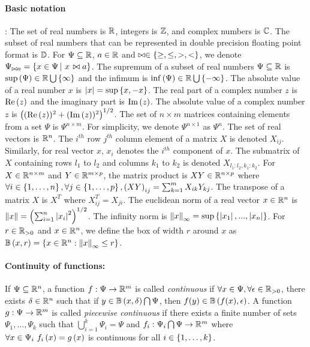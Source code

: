 \paragraph{Basic notation}:  The set of real numbers is $\mathbb{R}$,
integers is $\mathbb{Z}$, and complex numbers is $\mathbb{C}$.  The subset
of real numbers that can be represented in double precision floating
point format is $\mathbb{D}$.  For $\Psi\subseteq\mathbb{R}$, $a\in\mathbb{R}$
and $\bowtie\in\left\{\geq,\leq,>,<\right\}$, we denote $\Psi_{\bowtie a}
= \left\{ x\in\Psi \left|~x\right. \bowtie a \right\}$.  The supremum of a subset of real
numbers $\Psi\subseteq\mathbb{R}$ is
$\sup\left(\Psi\right)\in\mathbb{R}\bigcup\left\{\infty\right\}$ and the infimum is
$\inf\left(\Psi\right)\in\mathbb{R}\bigcup\left\{-\infty\right\}$.  The absolute value of a
real number $x$ is $\left|x\right| = \sup\left\{x,-x\right\}$.  The real part of a
complex number $z$ is $\operatorname{Re}\left(z\right)$ and the imaginary part is $\operatorname{Im}\left(z\right)$.  The
absolute value of a complex number $z$ is $\left((\operatorname{Re}\left(z\right))^2
+ (\operatorname{Im}\left(z\right))^2\right)^{1/2}$.  
The set of $n\times m$ matrices containing elements from a set $\Psi$
is $\Psi^{n\times m}$.  For simplicity, we denote $\Psi^{n\times 1}$
as $\Psi^n$.  The set of real vectors is $\mathbb{R}^n$.  The $i^{th}$ row
$j^{th}$ column element of a matrix $X$ is denoted $X_{ij}$.
Similarly, for real vector $x$, $x_i$ denotes the $i^{th}$ component
of $x$.  The submatrix of $X$ containing rows $l_1$ to $l_2$ and
columns $k_1$ to $k_2$ is denoted $X_{l_1:l_2,k_1:k_2}$.  For
$X\in\mathbb{R}^{n\times m}$ and $Y\in\mathbb{R}^{m\times p}$, the matrix
product is $XY\in\mathbb{R}^{n\times p}$ where $\forall
i\in\left\{1,\ldots,n\right\},\forall j\in\left\{1,\ldots,p\right\},\left(XY\right)_{ij}
= \sum_{k=1}^{m}X_{ik}Y_{kj}$.  The transpose of a matrix $X$ is $X^T$
where $X^T_{ij} = X_{ji}$.  The euclidean norm of a real vector
$x\in\mathbb{R}^n$ is $\left\|x\right\| = \left(\sum_{i=1}^n\left|x_i\right|^2\right)^{1/2}$.
The infinity norm is $\left\|x\right\|_\infty
= \sup\left\{\left|x_1\right|,...,\left|x_n\right|\right\}$.  For $r\in\mathbb{R}_{> 0}$  and
$x\in\mathbb{R}^n$, we define the box of width $r$ around $x$ as
$\mathbb{B}\left(x,r\right) = \left\{ x\in\mathbb{R}^n: \left\|x\right\|_\infty \leq r \right\}$.
%
\paragraph{Continuity of functions:} If $\Psi\subseteq\mathbb{R}^n$, a
function $f:\Psi\rightarrow\mathbb{R}^m$ is called \emph{continuous} if
$\forall x\in\Psi,\forall\epsilon\in\mathbb{R}_{>0}$, there exists
$\delta\in\mathbb{R}^n$ such that if $y\in\mathbb{B}\left(x,\delta\right)\bigcap\Psi$,
then $f(y)\in\mathbb{B}\left(f(x),\epsilon\right)$.  A function
$g:\Psi\rightarrow\mathbb{R}^m$ is called \emph{piecewise continuous} if
there exists a finite number of sets $\Psi_1,\ldots,\Psi_k$ such that
$\bigcup_{i=1}^k\Psi_i=\Psi$ and
$f_i:\Psi_i\bigcap\Psi\rightarrow \mathbb{R}^m$ where $\forall x\in\Psi_i~f_i\left(x\right)=g\left(x\right)$ is continuous for all
$i\in\left\{1,\ldots,k\right\}$.
%
